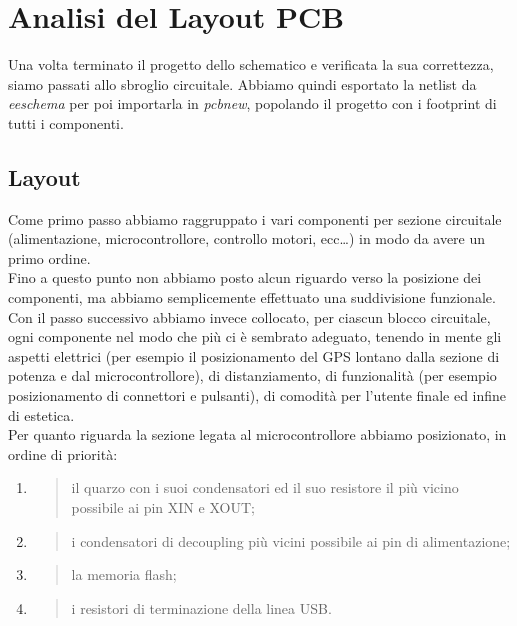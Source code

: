 \chapter{Analisi del Layout PCB}

Una volta terminato il progetto dello schematico e verificata la sua
correttezza, siamo passati allo sbroglio circuitale. Abbiamo quindi
esportato la netlist da \emph{eeschema} per poi importarla in
\emph{pcbnew}, popolando il progetto con i footprint di tutti i
componenti.

\hypertarget{layout}{%
\section{Layout}\label{layout}}

Come primo passo abbiamo raggruppato i vari componenti per sezione
circuitale (alimentazione, microcontrollore, controllo motori,
ecc\ldots) in modo da avere un primo ordine.\\
Fino a questo punto non abbiamo posto alcun riguardo verso la posizione
dei componenti, ma abbiamo semplicemente effettuato una suddivisione
funzionale. Con il passo successivo abbiamo invece collocato, per
ciascun blocco circuitale, ogni componente nel modo che più ci è
sembrato adeguato, tenendo in mente gli aspetti elettrici (per esempio
il posizionamento del GPS lontano dalla sezione di potenza e dal
microcontrollore), di distanziamento, di funzionalità (per esempio
posizionamento di connettori e pulsanti), di comodità per l'utente
finale ed infine di estetica.\\
Per quanto riguarda la sezione legata al microcontrollore abbiamo
posizionato, in ordine di priorità:

\begin{enumerate}
\def\labelenumi{\arabic{enumi}.}
\item
  \begin{quote}
  il quarzo con i suoi condensatori ed il suo resistore il più vicino
  possibile ai pin XIN e XOUT;
  \end{quote}
\item
  \begin{quote}
  i condensatori di decoupling più vicini possibile ai pin di
  alimentazione;
  \end{quote}
\item
  \begin{quote}
  la memoria flash;
  \end{quote}
\item
  \begin{quote}
  i resistori di terminazione della linea USB.
  \end{quote}
\end{enumerate}

